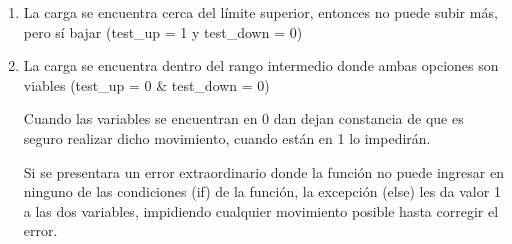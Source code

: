 \begin{itemize} [label = ·]
\begin{enumerate}
                            
                            
                            \item La carga se encuentra cerca del límite superior, entonces no puede subir más, pero sí bajar (test\_up = 1 y test\_down = 0)\par
                        
                            
                        
                            \item La carga se encuentra dentro del rango intermedio donde ambas opciones son viables (test\_up = 0 \& test\_down = 0)\par

                            
                        
                        Cuando las variables se encuentran en 0 dan dejan constancia de que es seguro realizar dicho movimiento, cuando están en 1 lo impedirán.\par
                        Si se presentara un error extraordinario donde la función no puede ingresar en ninguno de las condiciones (if) de la función, la excepción (else) les da valor 1 a las dos variables, impidiendo cualquier movimiento posible hasta corregir el error.\par
                        
                        \end{enumerate}

                \end{itemize}

